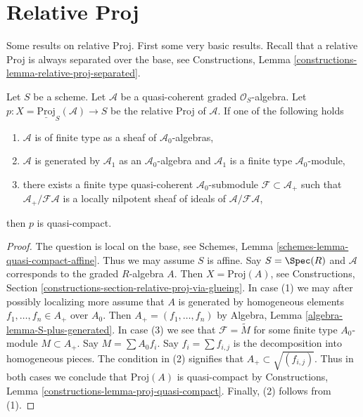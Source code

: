 \section{Relative Proj}
\label{section-relative-proj}

\noindent
Some results on relative Proj.
First some very basic results. Recall that a relative Proj is always
separated over the base, see
Constructions, Lemma \ref{constructions-lemma-relative-proj-separated}.

\begin{lemma}
\label{lemma-relative-proj-quasi-compact}
Let $S$ be a scheme. Let $\mathcal{A}$ be a quasi-coherent graded
$\mathcal{O}_S$-algebra. Let
$p : X = \underline{\text{Proj}}_S(\mathcal{A}) \to S$ be the relative
Proj of $\mathcal{A}$. If one of the following holds
\begin{enumerate}
\item $\mathcal{A}$ is of finite type as a sheaf of
$\mathcal{A}_0$-algebras,
\item $\mathcal{A}$ is generated by $\mathcal{A}_1$ as an
$\mathcal{A}_0$-algebra and $\mathcal{A}_1$ is a finite type
$\mathcal{A}_0$-module,
\item there exists a finite type quasi-coherent $\mathcal{A}_0$-submodule
$\mathcal{F} \subset \mathcal{A}_{+}$ such that
$\mathcal{A}_{+}/\mathcal{F}\mathcal{A}$ is a locally nilpotent
sheaf of ideals of $\mathcal{A}/\mathcal{F}\mathcal{A}$,
\end{enumerate}
then $p$ is quasi-compact.
\end{lemma}

\begin{proof}
The question is local on the base, see
Schemes, Lemma \ref{schemes-lemma-quasi-compact-affine}.
Thus we may assume $S$ is affine.
Say $S = \Spec(R)$ and $\mathcal{A}$ corresponds to the
graded $R$-algebra $A$. Then $X = \text{Proj}(A)$, see
Constructions, Section \ref{constructions-section-relative-proj-via-glueing}.
In case (1) we may after possibly localizing more
assume that $A$ is generated by homogeneous elements
$f_1, \ldots, f_n \in A_{+}$ over $A_0$. Then
$A_{+} = (f_1, \ldots, f_n)$ by
Algebra, Lemma \ref{algebra-lemma-S-plus-generated}.
In case (3) we see that $\mathcal{F} = \widetilde{M}$
for some finite type $A_0$-module $M \subset A_{+}$. Say
$M = \sum A_0f_i$. Say $f_i = \sum f_{i, j}$ is the decomposition
into homogeneous pieces. The condition in (2) signifies that
$A_{+} \subset \sqrt{(f_{i, j})}$. Thus in both cases we conclude that
$\text{Proj}(A)$ is quasi-compact by
Constructions, Lemma \ref{constructions-lemma-proj-quasi-compact}.
Finally, (2) follows from (1).
\end{proof}

